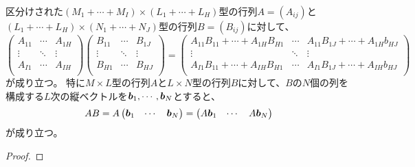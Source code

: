 \begin{proposition}[区分けされた行列の積]
区分けされた$(M_1+\cdots+M_I)\times(L_1+\cdots+L_H)$型の行列$A = (A_{i j})$と$(L_1+\cdots+L_H)\times(N_1+\cdots+N_J)$型の行列$B = (B_{i j})$に対して、
$$
\begin{pmatrix}
A_{1 1} & \cdots & A_{1 H} \\
\vdots & \ddots & \vdots \\
A_{I 1} & \cdots & A_{I H} \\
\end{pmatrix}
\begin{pmatrix}
B_{1 1} & \cdots & B_{1 J} \\
\vdots & \ddots & \vdots \\
B_{H 1} & \cdots & B_{H J} \\
\end{pmatrix}
=
\begin{pmatrix}
A_{1 1}B_{1 1}+\cdots+A_{1 H}B_{H 1} & \cdots & A_{1 1}B_{1 J}+\cdots+A_{1 H}b_{H J} \\
\vdots & \ddots & \vdots \\
A_{I 1}B_{1 1}+\cdots+A_{I H}B_{H 1} & \cdots & A_{I 1}B_{1 J}+\cdots+A_{I H}b_{H J} \\
\end{pmatrix}
$$
が成り立つ。
特に$M\times L$型の行列$A$と$L\times N$型の行列$B$に対して、$B$の$N$個の列を構成する$L$次の縦ベクトルを$\vb*{b}_1, \cdots, \vb*{b}_N$とすると、
$$
A B
= A\begin{pmatrix}\vb*{b}_1 & \cdots & \vb*{b}_N\end{pmatrix}
= \begin{pmatrix}A\vb*{b}_1 & \cdots & A\vb*{b}_N\end{pmatrix}
$$
が成り立つ。
\end{proposition}

\begin{proof}
\end{proof}

